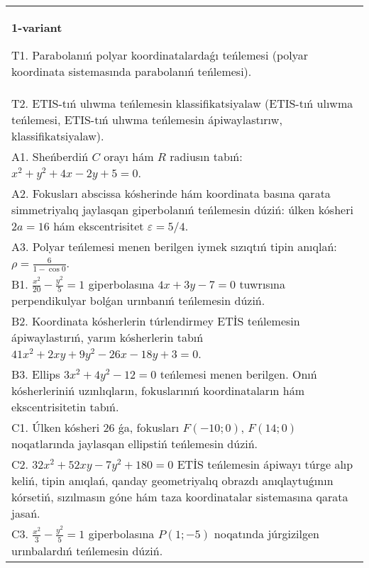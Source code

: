 \documentclass{article}
\begin{document}
\large
{}


\begin{tabular}{m{17cm}}
\textbf{1-variant}
\newline

T1. Parabolanıń polyar koordinatalardaǵı teńlemesi (polyar koordinata sistemasında parabolanıń teńlemesi).\\

T2. ETIS-tıń ulıwma teńlemesin klassifikatsiyalaw (ETIS-tıń ulıwma teńlemesi, ETIS-tıń ulıwma teńlemesin ápiwaylastırıw, klassifikatsiyalaw).\\

A1. Sheńberdiń $C$ orayı hám $R$ radiusın tabıń: $x^2+y^2+4 x-2 y+5=0$.\\

A2. Fokusları abscissa kósherinde hám koordinata basına qarata simmetriyalıq jaylasqan giperbolanıń teńlemesin dúziń: úlken kósheri $2 a=16$ hám ekscentrisitet $\varepsilon=5/4$.\\

A3. Polyar teńlemesi menen berilgen iymek sızıqtıń tipin anıqlań: $\rho=\frac{6}{1-\cos 0}$.\\

B1. $\frac{x^{2}}{20} - \frac{y^{2}}{5} = 1$ giperbolasına $4x + 3y - 7 = 0$ tuwrısına perpendikulyar bolǵan urınbanıń teńlemesin dúziń.  \\

B2. Koordinata kósherlerin túrlendirmey ETİS teńlemesin ápiwaylastırıń, yarım kósherlerin tabıń $41x^{2} + 2xy + 9y^{2} - 26x - 18y + 3 = 0$.  \\

B3. Ellips $3x^{2} + 4y^{2} - 12 = 0$ teńlemesi menen berilgen. Onıń kósherleriniń uzınlıqların, fokuslarınıń koordinataların hám ekscentrisitetin tabıń.  \\

C1. Úlken kósheri 26 ǵa, fokusları $F( - 10;0)$, $F(14;0)$ noqatlarında jaylasqan ellipstiń teńlemesin dúziń.  \\

C2. $32x^{2} + 52xy - 7y^{2} + 180 = 0$ ETİS teńlemesin ápiwayı túrge alıp keliń, tipin anıqlań, qanday geometriyalıq obrazdı anıqlaytuǵının kórsetiń, sızılmasın góne hám taza koordinatalar sistemasına qarata jasań.  \\

C3. $\frac{x^{2}}{3} - \frac{y^{2}}{5} = 1$ giperbolasına $P(1; - 5)$ noqatında júrgizilgen urınbalardıń teńlemesin dúziń.\\

\end{tabular}
\vspace{1cm}
\end{document}
